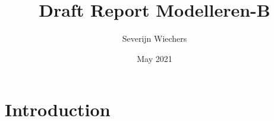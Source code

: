 \documentclass{article}
\title{Draft Report Modelleren-B}
\author{Severijn Wiechers}
\date{May 2021}
\begin{document}
\maketitle

\section{Introduction}
\end{document}
